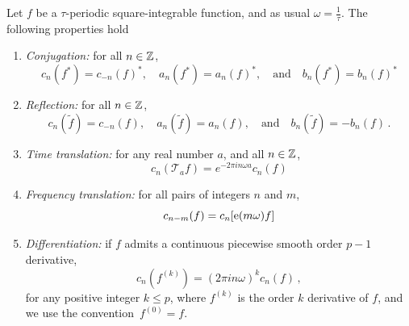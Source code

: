 \begin{proposition}
	\label{prop:fourier-coef-trans}
	Let $f$ be a $\tau$-periodic square-integrable function, and as usual
	$\omega=\frac{1}{\tau}$. The following properties hold
	\begin{enumerate}
		\item \emph{Conjugation:} for all $n\in\mathbb{Z}$,
		      \begin{equation}
			      c_n(f^*)=c_{-n}(f)^*,\quad a_n(f^*)=a_n(f)^*,\quad\text{and}\quad
			      b_n(f^*)=b_n(f)^*
		      \end{equation}
		\item \emph{Reflection:} for all $n\in\mathbb{Z}$,
		      \begin{equation}
			      c_n(\tilde{f})=c_{-n}(f),\quad a_n(\tilde{f})=a_n(f),\quad\text{and}\quad
			      b_n(\tilde{f})=-b_n(f)\,.
		      \end{equation}
		\item \emph{Time translation:} for any real number $a$, and all $n\in\mathbb{Z}$,
		      \begin{equation}
			      c_n(\mathcal{T}_af)=e^{-2\pi i n\omega a}c_n(f)\label{eq:cn-timetrans}
		      \end{equation}
		\item \emph{Frequency translation:} for all pairs of integers $n$ and $m$,
		      \begin{equation}
			      c_{n-m}(f)=c_{n}[\operatorname{e}(m\omega)f]
		      \end{equation}
		\item \emph{Differentiation:} if $f$ admits a continuous piecewise smooth order $p-1$
		      derivative,
		      \begin{equation}
			      c_n(f^{(k)})=(2\pi i n\omega)^kc_n(f)\,,\label{eq:cn-der}
		      \end{equation}
		      for any positive integer $k\leq p$, where $f^{(k)}$ is the order $k$ derivative of
		      $f$, and we use the convention~$f^{(0)}=f$.
	\end{enumerate}
\end{proposition}
